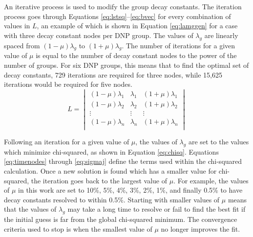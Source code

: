 \documentclass{style/nseJournal}
\begin{document}
An iterative process is used to modify the group decay constants.
The iteration process goes through Equations \eqref{eq:lstsq}--\eqref{eq:bvec} for every combination of values in $L$, an example of which is shown in Equation \eqref{eq:lamggen} for a case with three decay constant nodes per DNP group.
The values of $\lambda_g$ are linearly spaced from $\left(1 - \mu \right) \lambda_g$ to  $\left(1 + \mu \right) \lambda_g$.
The number of iterations for a given value of $\mu$ is equal to the number of decay constant nodes to the power of the number of groups.
For six DNP groups, this means that to find the optimal set of decay constants, 729 iterations are required for three nodes, while 15,625 iterations would be required for five nodes.
\begin{equation}
    L = 
\begin{vmatrix}
\left(1 - \mu \right) \lambda_1 & \lambda_1 & \left(1 + \mu \right) \lambda_1\\
\left(1 - \mu \right) \lambda_2 & \lambda_2 & \left(1 + \mu \right) \lambda_2\\
\vdots                       & \vdots       &  \vdots                      \\
\left(1 - \mu \right) \lambda_n & \lambda_n & \left(1 + \mu \right) \lambda_n\\
\end{vmatrix}
    \label{eq:lamggen}
\end{equation}

Following an iteration for a given value of $\mu$, the values of $\lambda_g$ are set to the values which minimize chi-squared, as shown in Equation \eqref{eq:chisq}.
Equations \eqref{eq:timenodes} through \eqref{eq:sigmaj} define the terms used within the chi-squared calculation.
Once a new solution is found which has a smaller value for chi-squared, the iteration goes back to the largest value of $\mu$.
For example, the values of $\mu$ in this work are set to 10\%, 5\%, 4\%, 3\%, 2\%, 1\%, and finally 0.5\% to have decay constants resolved to within 0.5\%.
Starting with smaller values of $\mu$ means that the values of $\lambda_g$ may take a long time to resolve or fail to find the best fit if the initial guess is far from the global chi-squared minimum.
The convergence criteria used to stop is when the smallest value of $\mu$ no longer improves the fit.
\end{document}
